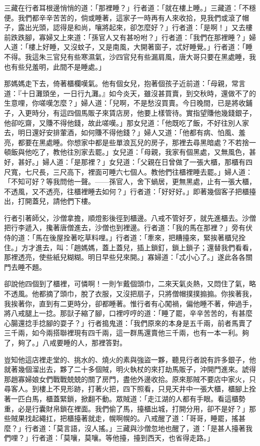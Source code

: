 三藏在行者耳根邊悄悄的道：「那裡睡？」行者道：「就在樓上睡。」三藏道：「不穩便。我們都辛辛苦苦的，倘或睡著，這家子一時再有人來收拾，見我們或滾了帽子，露出光頭，認得是和尚，嚷將起來，卻怎麼好？」行者道：「是啊！」又去樓前跌跌腳，寡婦又上來道：「孫官人又有甚吩咐？」行者道：「我們在那裡睡？」婦人道：「樓上好睡，又沒蚊子，又是南風，大開著窗子，忒好睡覺。」行者道：「睡不得。我這朱三官兒有些寒濕氣，沙四官兒有些漏肩風，唐大哥只要在黑處睡，我也有些兒羞明，此間不是睡處。」

那媽媽走下去，倚著櫃欄嘆氣。他有個女兒，抱著個孩子近前道：「母親，常言道：『十日灘頭坐，一日行九灘。』如今炎天，雖沒甚買賣，到交秋時，還做不了的生意哩，你嗟嘆怎麼？」婦人道：「兒啊，不是愁沒買賣。今日晚間，已是將收鋪子，入更時分，有這四個馬販子來賃店房，他要上樣管待。實指望賺他幾錢銀子，他卻吃齋，又賺不得他錢，故此嗟嘆。」那女兒道：「他既吃了飯，不好往別人家去，明日還好安排葷酒，如何賺不得他錢？」婦人又道：「他都有病、怕風、羞亮，都要在黑處睡。你想家中都是些單浪瓦兒的房子，那裡去尋黑暗處？不若捨一頓飯與他吃了，教他往別家去罷。」女兒道：「母親，我家有個黑處，又無風色，甚好，甚好。」婦人道：「是那裡？」女兒道：「父親在日曾做了一張大櫃，那櫃有四尺寬，七尺長，三尺高下，裡面可睡六七個人。教他們往櫃裡睡去罷。」婦人道：「不知可好？等我問他一聲。——孫官人，舍下蝸居，更無黑處，止有一張大櫃，不透風，又不透亮，往櫃裡睡去如何？」行者道：「好好好。」即著幾個客子把櫃擡出，打開蓋兒，請他們下樓。

行者引著師父，沙僧拿擔，順燈影後徑到櫃邊。八戒不管好歹，就先進櫃去。沙僧把行李遞入，攙著唐僧進去，沙僧也到裡邊。行者道：「我的馬在那裡？」旁有伏侍的道：「馬在後屋拴著吃草料哩。」行者道：「牽來，把糟擡來，緊挨著櫃兒拴住。」方才進去，叫：「趙媽媽，蓋上蓋兒，插上鎖釘，鎖上鎖子；還替我們看看，那裡透亮，使些紙兒糊糊。明日早些兒來開。」寡婦道：「忒小心了。」遂此各各關門去睡不題。

卻說他四個到了櫃裡，可憐啊！一則乍戴個頭巾，二來天氣炎熱，又悶住了氣，略不透風。他都摘了頭巾，脫了衣服，又沒把扇子，只將僧帽撲撲搧搧。你挨著我，我挨著你，直到有二更時分，卻都睡著。惟行者有心闖禍，偏他睡不著，伸過手，將八戒腿上一捻。那獃子縮了腳，口裡哼哼的道：「睡了罷，辛辛苦苦的，有甚麼心腸還捻手捻腳的耍子？」行者搗鬼道：「我們原來的本身是五千兩，前者馬賣了三千兩，如今兩搭聯裡現有四千兩，這一群馬還賣他三千兩，也有一本一利。夠了，夠了。」八戒要睡的人，那裡答對。

豈知他這店裡走堂的、挑水的、燒火的素與強盜一夥，聽見行者說有許多銀子，他就著幾個溜出去，夥了二十多個賊，明火執杖的來打劫馬販子，沖開門進來。諕得那趙寡婦娘女們戰戰兢兢的關了房門，盡他外邊收拾。原來那賊不要店中家火，只尋客人。到樓上不見形跡，打著火把，四下照看，只見天井中一張大櫃，櫃腳上拴著一匹白馬，櫃蓋緊鎖，掀翻不動。眾賊道：「走江湖的人都有手眼。看這櫃勢重，必是行囊財帛鎖在裡面。我們偷了馬，擡櫃出城，打開分用，卻不是好？」那些賊果找起繩扛，把櫃擡著就走，幌啊幌的。八戒醒了道：「哥哥，睡罷，搖甚麼？」行者道：「莫言語，沒人搖。」三藏與沙僧忽地也醒了，道：「是甚人擡著我們哩？」行者道：「莫嚷，莫嚷。等他擡，擡到西天，也省得走路。」

